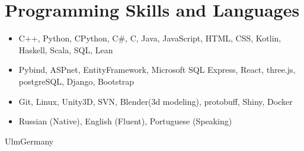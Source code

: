 \documentclass[11pt,a4paper,sans]{moderncv}        %
\begin{document}
	\section{Programming Skills and Languages}
		\begin{itemize}
			\item C++, Python, CPython, C\#, C, Java, JavaScript, HTML, CSS, Kotlin, Haskell, Scala, SQL, Lean
			\item Pybind, ASPnet, EntityFramework, Microsoft SQL Express, React, three.js, postgreSQL, Django, Bootstrap
			\item Git, Linux, Unity3D, SVN, Blender(3d modeling), protobuff, Shiny, Docker
			\item Russian (Native), English (Fluent), Portuguese (Speaking)
		\end{itemize}
		
		\vspace*{\fill}
		\name{}{}
		\title{}
		\address{Bismarckring, 64}{Ulm}{Germany}
		\makecvtitle
	
\end{document}
